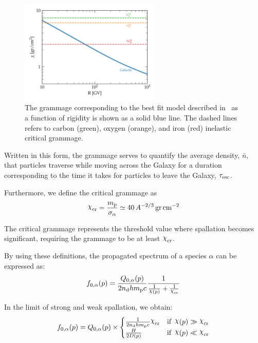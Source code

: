 \begin{figure}[t]
\centering
\includegraphics[width=0.6\textwidth]{figures/grammage_critical.pdf}
\caption{The grammage corresponding to the best fit model described in~\cite{Schroer2021prd} as a function of rigidity is shown as a solid blue line. The dashed lines refers to carbon (green), oxygen (orange), and iron (red) inelastic critical grammage.}
\label{fig:grammage}
\end{figure}

Written in this form, the grammage serves to quantify the average density, $\bar n$, that particles traverse while moving across the Galaxy for a duration corresponding to the time it takes for particles to leave the Galaxy, $\tau_{\rm esc}$.

Furthermore, we define the critical grammage as 
%
\begin{equation}
\rchi_{\rm cr} = \frac{m_{\rm p}}{\sigma_\alpha} \simeq 40 \, A^{-2/3} \, \text{gr} \, \text{cm}^{-2}
\end{equation}

The critical grammage represents the threshold value where spallation becomes significant, requiring the grammage to be at least $\rchi_{\rm cr}$.

By using these definitions, the propagated spectrum of a species $\alpha$ can be expressed as:
%
\begin{equation}
f_{0,\alpha}(p) = \frac{Q_{0,\alpha}(p)}{2n_{\rm d}hm_{\rm p}c} \frac{1}{\frac{1}{\rchi(p)} + \frac{1}{\rchi_{\rm cr}}}
\label{eq:finalprimary}
\end{equation}

In the limit of strong and weak spallation, we obtain:
%
\begin{equation}
f_{0,\alpha}(p) = Q_{0,\alpha}(p) \times
\begin{cases}
\frac{1}{2n_{\rm d}hm_{\rm p}c}\rchi_{\rm cr} & \text{if } \, \rchi(p) \gg \rchi_{\rm cr} \\
\frac{H}{2D(p)} & \text{if } \, \rchi(p) \ll \rchi_{\rm cr}
\end{cases}
\end{equation}

